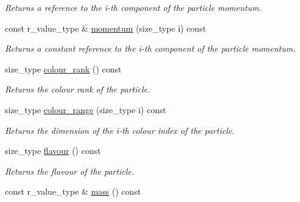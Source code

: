 \begin{DoxyCompactItemize}
\begin{DoxyCompactList}\small\item\em Returns a reference to the i-\/th component of the particle momentum. \end{DoxyCompactList}\item 
\hypertarget{a00026_a97a6c06706eef896190e981318171e9c}{const r\-\_\-value\-\_\-type \& \hyperlink{a00026_a97a6c06706eef896190e981318171e9c}{momentum} (size\-\_\-type i) const }\label{a00026_a97a6c06706eef896190e981318171e9c}

\begin{DoxyCompactList}\small\item\em Returns a constant reference to the i-\/th component of the particle momentum. \end{DoxyCompactList}\item 
\hypertarget{a00026_a0aeae7bdb659f9526f3ecf2790241c71}{size\-\_\-type \hyperlink{a00026_a0aeae7bdb659f9526f3ecf2790241c71}{colour\-\_\-rank} () const }\label{a00026_a0aeae7bdb659f9526f3ecf2790241c71}

\begin{DoxyCompactList}\small\item\em Returns the colour rank of the particle. \end{DoxyCompactList}\item 
\hypertarget{a00026_a4aaab3d10c04ee8a95a6efa3351e0a00}{size\-\_\-type \hyperlink{a00026_a4aaab3d10c04ee8a95a6efa3351e0a00}{colour\-\_\-range} (size\-\_\-type i) const }\label{a00026_a4aaab3d10c04ee8a95a6efa3351e0a00}

\begin{DoxyCompactList}\small\item\em Returns the dimension of the i-\/th colour index of the particle. \end{DoxyCompactList}\item 
\hypertarget{a00026_aefeccbe359caf71b0d900cdbf26ff3fc}{size\-\_\-type \hyperlink{a00026_aefeccbe359caf71b0d900cdbf26ff3fc}{flavour} () const }\label{a00026_aefeccbe359caf71b0d900cdbf26ff3fc}

\begin{DoxyCompactList}\small\item\em Returns the flavour of the particle. \end{DoxyCompactList}\item 
\hypertarget{a00026_a65e653d9a4b01618a66de41d755e0d67}{const r\-\_\-value\-\_\-type \& \hyperlink{a00026_a65e653d9a4b01618a66de41d755e0d67}{mass} () const }\label{a00026_a65e653d9a4b01618a66de41d755e0d67}


\end{DoxyCompactItemize}

